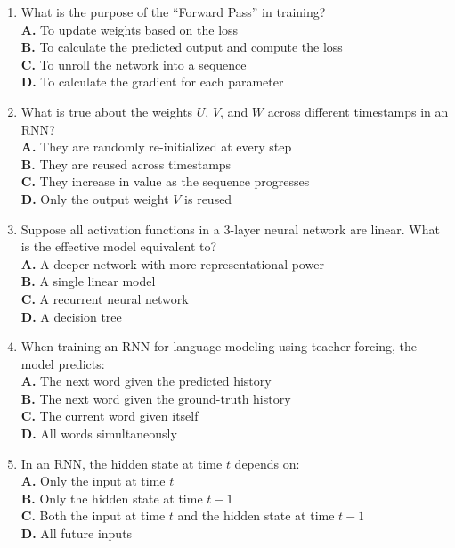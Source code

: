 \documentclass[11pt]{article}
\begin{document}
\begin{enumerate}[label=Q\arabic*., leftmargin=*]
\item What is the purpose of the ``Forward Pass'' in training?\\[0.25em]
\textbf{A.} To update weights based on the loss\\
\textbf{B.} To calculate the predicted output and compute the loss\\
\textbf{C.} To unroll the network into a sequence\\
\textbf{D.} To calculate the gradient for each parameter

\item What is true about the weights $U$, $V$, and $W$ across different timestamps in an RNN?\\[0.25em]
\textbf{A.} They are randomly re-initialized at every step\\
\textbf{B.} They are reused across timestamps\\
\textbf{C.} They increase in value as the sequence progresses\\
\textbf{D.} Only the output weight $V$ is reused

\item Suppose all activation functions in a 3-layer neural network are linear. What is the effective model equivalent to?\\[0.25em]
\textbf{A.} A deeper network with more representational power\\
\textbf{B.} A single linear model\\
\textbf{C.} A recurrent neural network\\
\textbf{D.} A decision tree

\item When training an RNN for language modeling using teacher forcing, the model predicts:\\[0.25em]
\textbf{A.} The next word given the predicted history\\
\textbf{B.} The next word given the ground-truth history\\
\textbf{C.} The current word given itself\\
\textbf{D.} All words simultaneously

\item In an RNN, the hidden state at time $t$ depends on:\\[0.25em]
\textbf{A.} Only the input at time $t$\\
\textbf{B.} Only the hidden state at time $t-1$\\
\textbf{C.} Both the input at time $t$ and the hidden state at time $t-1$\\
\textbf{D.} All future inputs


\end{enumerate}
\end{document}
